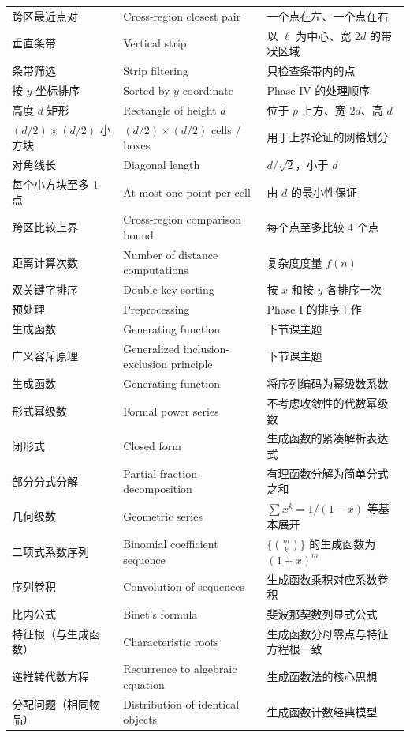 \documentclass[UTF8,11pt,a4paper]{ctexbook}   %
\theoremstyle{definition}
\begin{document}
\begin{longtable}{|p{4.8cm}|p{4.8cm}|p{4.8cm}|}
跨区最近点对 & Cross-region closest pair & 一个点在左、一个点在右 \\
垂直条带 & Vertical strip & 以 $\ell$ 为中心、宽 $2d$ 的带状区域 \\
条带筛选 & Strip filtering & 只检查条带内的点 \\
按 $y$ 坐标排序 & Sorted by $y$-coordinate & Phase IV 的处理顺序 \\
高度 $d$ 矩形 & Rectangle of height $d$ & 位于 $p$ 上方、宽 $2d$、高 $d$ \\
$(d/2)\times(d/2)$ 小方块 & $(d/2)\times(d/2)$ cells / boxes & 用于上界论证的网格划分 \\
对角线长 & Diagonal length & $d/\sqrt{2}$，小于 $d$ \\
每个小方块至多 1 点 & At most one point per cell & 由 $d$ 的最小性保证 \\
跨区比较上界 & Cross-region comparison bound & 每个点至多比较 4 个点 \\
距离计算次数 & Number of distance computations & 复杂度度量 $f(n)$ \\
双关键字排序 & Double-key sorting & 按 $x$ 和按 $y$ 各排序一次 \\
预处理 & Preprocessing & Phase I 的排序工作 \\
生成函数 & Generating function & 下节课主题 \\
广义容斥原理 & Generalized inclusion-exclusion principle & 下节课主题 \\
\hline
生成函数 & Generating function & 将序列编码为幂级数系数 \\
形式幂级数 & Formal power series & 不考虑收敛性的代数幂级数 \\
闭形式 & Closed form & 生成函数的紧凑解析表达式 \\
部分分式分解 & Partial fraction decomposition & 有理函数分解为简单分式之和 \\
几何级数 & Geometric series & $\sum x^k = 1/(1-x)$ 等基本展开 \\
二项式系数序列 & Binomial coefficient sequence & $\{\binom{m}{k}\}$ 的生成函数为 $(1+x)^m$ \\
序列卷积 & Convolution of sequences & 生成函数乘积对应系数卷积 \\
比内公式 & Binet's formula & 斐波那契数列显式公式 \\
特征根（与生成函数） & Characteristic roots & 生成函数分母零点与特征方程根一致 \\
递推转代数方程 & Recurrence to algebraic equation & 生成函数法的核心思想 \\
分配问题（相同物品） & Distribution of identical objects & 生成函数计数经典模型 \\

\end{longtable}
\end{document}
